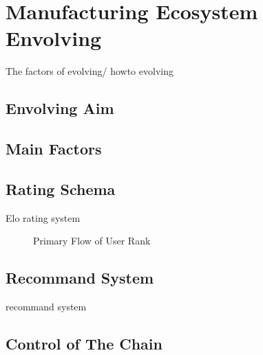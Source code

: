 \section{Manufacturing Ecosystem Envolving} %
\label{sec:envolve}
The factors of evolving/ howto evolving

\subsection{Envolving Aim} %
\label{sub:envolving_aim}

\subsection{Main Factors} %
\label{sub:main_factors}


\subsection{Rating Schema} %
\label{sub:rating_schema}
Elo rating system
\begin{figure}[!h]
\centering\small
\caption{Primary Flow of User Rank}
\label{fig:userrank}
\end{figure}

\subsection{Recommand System} %
\label{sub:recommand_system}
recommand system 

\subsection{Control of The Chain} %
\label{sub:control}

